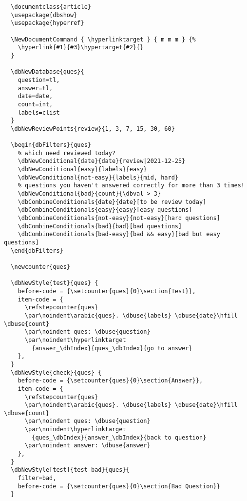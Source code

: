 \documentclass[full]{l3doc}
\begin{document}
\begin{documentation}
\begin{verbatim}
  \documentclass{article}
  \usepackage{dbshow}
  \usepackage{hyperref}

  \NewDocumentCommand { \hyperlinktarget } { m m m } {%
    \hyperlink{#1}{#3}\hypertarget{#2}{}
  }

  \dbNewDatabase{ques}{
    question=tl,
    answer=tl,
    date=date,
    count=int,
    labels=clist
  }
  \dbNewReviewPoints{review}{1, 3, 7, 15, 30, 60}

  \begin{dbFilters}{ques}
    % which need reviewed today?
    \dbNewConditional{date}{date}{review|2021-12-25}
    \dbNewConditional{easy}{labels}{easy}
    \dbNewConditional{not-easy}{labels}{mid, hard}
    % questions you haven't answered correctly for more than 3 times!
    \dbNewConditional{bad}{count}{\dbval > 3}
    \dbCombineConditionals{date}{date}[to be review today]
    \dbCombineConditionals{easy}{easy}[easy questions]
    \dbCombineConditionals{not-easy}{not-easy}[hard questions]
    \dbCombineConditionals{bad}{bad}[bad questions]
    \dbCombineConditionals{bad-easy}{bad && easy}[bad but easy questions]
  \end{dbFilters}

  \newcounter{ques}

  \dbNewStyle{test}{ques} {
    before-code = {\setcounter{ques}{0}\section{Test}},
    item-code = {
      \refstepcounter{ques}
      \par\noindent\arabic{ques}. \dbuse{labels} \dbuse{date}\hfill \dbuse{count}
      \par\noindent ques: \dbuse{question}
      \par\noindent\hyperlinktarget
        {answer_\dbIndex}{ques_\dbIndex}{go to answer}
    },
  }
  \dbNewStyle{check}{ques} {
    before-code = {\setcounter{ques}{0}\section{Answer}},
    item-code = {
      \refstepcounter{ques}
      \par\noindent\arabic{ques}. \dbuse{labels} \dbuse{date}\hfill \dbuse{count}
      \par\noindent ques: \dbuse{question}
      \par\noindent\hyperlinktarget
        {ques_\dbIndex}{answer_\dbIndex}{back to question}
      \par\noindent answer: \dbuse{answer}
    },
  }
  \dbNewStyle[test]{test-bad}{ques}{
    filter=bad,
    before-code = {\setcounter{ques}{0}\section{Bad Question}}
  }


\end{verbatim}
\end{documentation}
\end{document}
